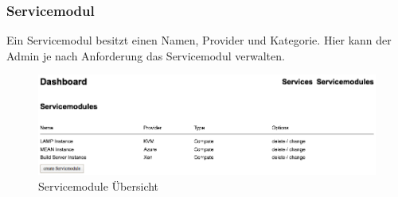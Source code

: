 \subsubsection{Servicemodul}
Ein \gls{Servicemodul} besitzt einen Namen, Provider und Kategorie.
Hier kann der Admin je nach Anforderung das Servicemodul verwalten.
\begin{figure}[!htbp]
\includegraphics[width=\textwidth]{./04_Anforderungen/images/servicemodules_admin}
\caption{Servicemodule Übersicht}
\end{figure}